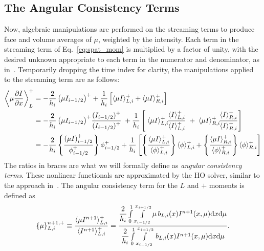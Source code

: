 \subsection{The Angular Consistency Terms}
\label{sec:ang_cons}

Now, algebraic manipulations are performed on the streaming terms to produce face and
volume averages of $\mu$, weighted by the intensity.  Each term in the streaming
term of Eq.~\eqref{eq:spat_mom} is multiplied by a factor of unity, with the desired unknown appropriate to each term
in the numerator and denominator, as in~\cite{wolters}.  Temporarily dropping the time
index for clarity, the manipulations applied to
the streaming term are as follows:
    \begin{align} \label{eq:line1}
        {\displaystyle \left \langle \mu \frac{\partial I}{\partial x} \right \rangle_L^+ } & = 
        -\frac{\displaystyle2}{\displaystyle h_i} \left(\mu I_{i-1/2}\right)^+ + \frac{\displaystyle 1}{\displaystyle h_i}\left[
    \langle \mu I \rangle_{L,i}^+ + \langle \mu I \rangle_{R,i}^+ \right] \\
        & =  
        -\frac{\displaystyle2}{\displaystyle h_i} \left(\mu I_{i-1/2}\right)^+
        \! \frac{\displaystyle(I_{i-1/2})^+}{\displaystyle(I_{i-1/2})^+}  \;    + \frac{\displaystyle 1}{\displaystyle h_i}\left[ \;
        \langle \mu I \rangle_{L,i}^+ \! \frac{\displaystyle\langle I \rangle_{L,i}^+}{\displaystyle\langle I \rangle_{L,i}^+} \; + \; \langle \mu
        I \rangle_{R,i}^+ \! \frac{\displaystyle\langle I \rangle_{R,i}^+}{\displaystyle\langle I \rangle_{R,i}^+} \right] \\
        & =  -\frac{\displaystyle2}{\displaystyle h_i} \left\{ {\frac{\displaystyle \left( \mu I
            \right)^+_{i-1/2} }{\displaystyle\phi^+_{i-1/2}}} \right\}
            \phi^+_{i-1/2} + \frac{\displaystyle 1}{\displaystyle h_i} \left[ \left\{ {\frac{\displaystyle\langle \mu
        I \rangle_{L,i}^+}{\displaystyle\langle \phi \rangle_{L,i}^+}} \right \} \langle \phi \rangle_{L,i}^+  +
        \left\{ {\frac{\displaystyle\langle \mu I \rangle_{R,i}^+}{\displaystyle\langle \phi \rangle_{R,i}^+}} \right\}
    \langle \phi \rangle_{R,i}^+ \right]
    \end{align}
The ratios in braces are what we will formally define as \emph{angular consistency terms}.
These nonlinear functionals are approximated by the HO solver, similar to the approach
in~\cite{wolters}.  The angular consistency
term for the $L$ and $+$ moments is defined as
\begin{equation}\label{eq:ang_cons_vol}
    \left\{ {\mu} \right\}_{L,i}^{n+1,+} \equiv \frac{\langle \mu I^{n+1} \rangle_{L,i}^+}{\langle I^{n+1} \rangle_{L,i}^+} =  \frac{
{\displaystyle \frac{2}{h_i}} \int\limits_0^1 \int\limits_{x_{i-1/2}}^{x_{i+1/2}} \mu \, b_{L,i}(x)
I^{n+1}(x,\mu) \mathrm{d} x \mathrm{d} \mu } 
{{\displaystyle \frac{2}{h_i}} \int\limits_0^1 \int\limits_{x_{i-1/2}}^{x_{i+1/2}} \, b_{L,i}(x)
I^{n+1}(x,\mu) \mathrm{d} x \mathrm{d} \mu } .
\end{equation}
